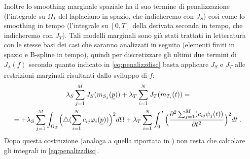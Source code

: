 \documentclass[a4paper,11pt,twoside,openright]{book}							%
\begin{document}
Inoltre lo smoothing marginale spaziale ha il suo termine di penalizzazione (l'integrale su $\Omega_T$ del laplaciano in spazio, che indicheremo con $J_S$) così come lo smoothing in tempo (l'integrale su $[0,T]$ della derivata seconda in tempo, che indicheremo con $J_T$). Tali modelli marginali sono già stati trattati in letteratura con le stesse basi dei casi che saranno analizzati in seguito (elementi finiti in spazio e B-spline in tempo), quindi per discretizzare gli ultimi due termini di $J_{\underline \lambda }(f)$ secondo quanto indicato in \ref{eq:penalizzdisc} basta applicare $J_S$ e $J_T$ alle restrizioni marginali risultanti dallo sviluppo di $f$:
\begin{multline*}
\lambda_S  \sum_{j=1}^M J_S(m_{S_j}(\underline p)) +
\lambda_T \sum_{i=1}^N J_T(m_{T_i}(t)) =\\
=+\lambda_S  \sum_{j=1}^M \int_{\Omega_T} \Bigl( \triangle(\sum_{i=1}^N  c_{ij}\varphi_i (\underline p)) \Bigr)^2 d \Omega + \lambda_T \sum_{i=1}^N\int_0^T \Bigl( \frac{\partial^2 \sum_{j=1}^M(c_{ij}\psi_j(t)) }{\partial t ^2} \Bigr)^2 dt \ .
\end{multline*}
Dopo questa costruzione (analoga a quella riportata in \cite{art:marra}) non resta che calcolare gli integrali in \ref{eq:penalizzdisc}.
\end{document}
